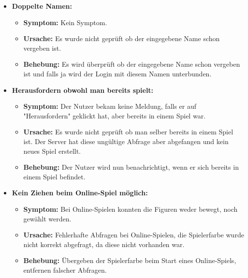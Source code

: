 \documentclass[parskip=full]{scrartcl}
\begin{document}
\begin{itemize}
\item{\textbf{Doppelte Namen:}}
\begin{itemize}
	\item{\textbf{Symptom:}} Kein Symptom.
	\item{\textbf{Ursache:}} Es wurde nicht geprüft ob der eingegebene Name schon vergeben ist.
	\item{\textbf{Behebung:}} Es wird überprüft ob der eingegebene Name schon vergeben ist und falls ja wird der Login mit diesem Namen unterbunden.
\end{itemize}

\item{\textbf{Herausfordern obwohl man bereits spielt:}}
\begin{itemize}
	\item{\textbf{Symptom:}} Der Nutzer bekam keine Meldung, falls er auf "Herausfordern" geklickt hat, aber bereits in einem Spiel war.
	\item{\textbf{Ursache:}} Es wurde nicht geprüft ob man selber bereits in einem Spiel ist. Der Server hat diese ungültige Abfrage aber abgefangen und kein neues Spiel erstellt. 
	\item{\textbf{Behebung:}} Der Nutzer wird nun benachrichtigt, wenn er sich bereits in einem Spiel befindet.
\end{itemize}


\item{\textbf{Kein Ziehen beim Online-Spiel möglich:}}
\begin{itemize}
	\item{\textbf{Symptom:}} Bei Online-Spielen konnten die Figuren weder bewegt, noch gewählt werden.
	\item{\textbf{Ursache:}} Fehlerhafte Abfragen bei Online-Spielen, die Spielerfarbe wurde nicht korrekt abgefragt, da diese nicht vorhanden war.
	\item{\textbf{Behebung:}} Übergeben der Spielerfarbe beim Start eines Online-Spiels, entfernen falscher Abfragen.
\end{itemize}

\end{itemize}
\end{document}
